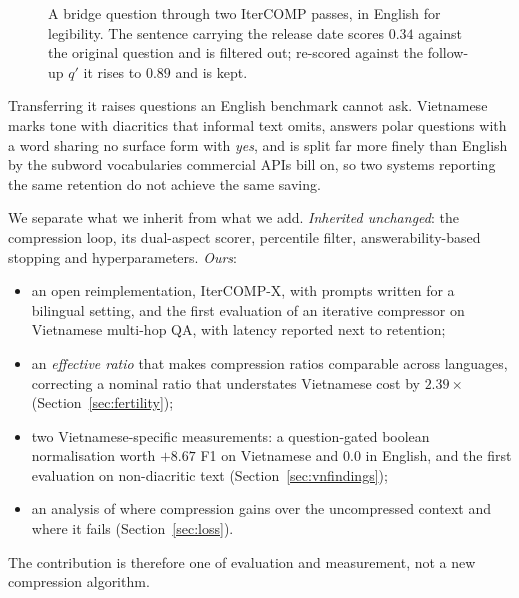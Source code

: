 \documentclass[runningheads]{llncs}
\begin{document}
\begin{figure}[H]
{}
\caption{A bridge question through two IterCOMP passes, in English for
legibility. The sentence carrying the release date scores $0.34$ against the
original question and is filtered out; re-scored against the follow-up $q'$ it
rises to $0.89$ and is kept.}
\label{fig:arch}
\end{figure}

Transferring it raises questions an English benchmark cannot ask. Vietnamese
marks tone with diacritics that informal text omits, answers polar questions
with a word sharing no surface form with \emph{yes}, and is split far more finely
than English by the subword vocabularies commercial APIs bill on, so two systems
reporting the same retention do not achieve the same saving.

We separate what we inherit from what we add. \emph{Inherited unchanged}: the
compression loop, its dual-aspect scorer, percentile filter, answerability-based
stopping and hyperparameters. \emph{Ours}:
\begin{itemize}[leftmargin=1.2em,itemsep=0pt,topsep=2pt,parsep=0pt]
\item an open reimplementation, IterCOMP-X, with prompts written for a bilingual
  setting, and the first evaluation of an iterative compressor on Vietnamese
  multi-hop QA, with latency reported next to retention;
\item an \emph{effective ratio} that makes compression ratios comparable across
  languages, correcting a nominal ratio that understates Vietnamese cost by
  $2.39\times$ (Section~\ref{sec:fertility});
\item two Vietnamese-specific measurements: a question-gated boolean
  normalisation worth $+8.67$ F1 on Vietnamese and $0.0$ in English, and the
  first evaluation on non-diacritic text (Section~\ref{sec:vnfindings});
\item an analysis of where compression gains over the uncompressed context
  and where it fails (Section~\ref{sec:loss}).
\end{itemize}
The contribution is therefore one of evaluation and measurement, not a new
compression algorithm.
\end{document}
